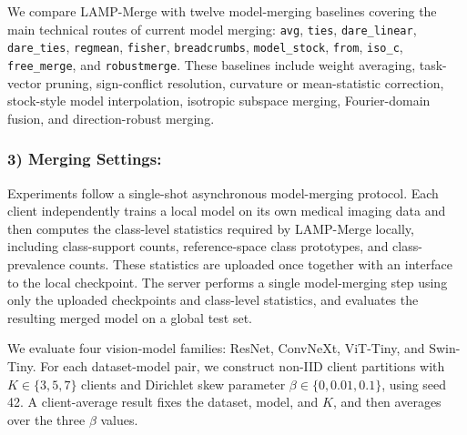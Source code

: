 \documentclass[letterpaper]{article} %
\begin{document}
We compare LAMP-Merge with twelve model-merging baselines covering the main technical routes of current model merging: \texttt{avg}\cite{pmlr-v162-wortsman22a}, \texttt{ties}\cite{yadav2023tiesmergingresolvinginterferencemerging}, \texttt{dare\_linear}\cite{yu2024languagemodelssupermario}, \texttt{dare\_ties}\cite{yu2024languagemodelssupermario}, \texttt{regmean}\cite{jin2025datalessknowledgefusionmerging}, \texttt{fisher}\cite{matena2022mergingmodelsfisherweightedaveraging}, \texttt{breadcrumbs}\cite{davari2024modelbreadcrumbsscalingmultitask}, \texttt{model\_stock}\cite{jang2025modelstockneedjust}, \texttt{from}\cite{ilharco2023editingmodelstaskarithmetic}, \texttt{iso\_c}\cite{marczak2025taskleftbehindisotropic}, \texttt{free\_merge}\cite{zheng2025freemergingfouriertransformefficient}, and \texttt{robustmerge}\cite{zeng2025robustmergeparameterefficientmodelmerging}. These baselines include weight averaging, task-vector pruning, sign-conflict resolution, curvature or mean-statistic correction, stock-style model interpolation, isotropic subspace merging, Fourier-domain fusion, and direction-robust merging.

\subsubsection{3) Merging Settings:}

Experiments follow a single-shot asynchronous model-merging protocol. Each client independently trains a local model on its own medical imaging data and then computes the class-level statistics required by LAMP-Merge locally, including class-support counts, reference-space class prototypes, and class-prevalence counts. These statistics are uploaded once together with an interface to the local checkpoint. The server performs a single model-merging step using only the uploaded checkpoints and class-level statistics, and evaluates the resulting merged model on a global test set.

We evaluate four vision-model families: ResNet, ConvNeXt, ViT-Tiny, and Swin-Tiny\cite{he2016deep,liu2022convnet,dosovitskiy2021image,liu2021swin}. For each dataset-model pair, we construct non-IID client partitions with $K\in\{3,5,7\}$ clients and Dirichlet skew parameter $\beta\in\{0,0.01,0.1\}$, using seed 42\cite{hsu2019measuringeffectsnonidenticaldata}. A client-average result fixes the dataset, model, and $K$, and then averages over the three $\beta$ values.
\end{document}
